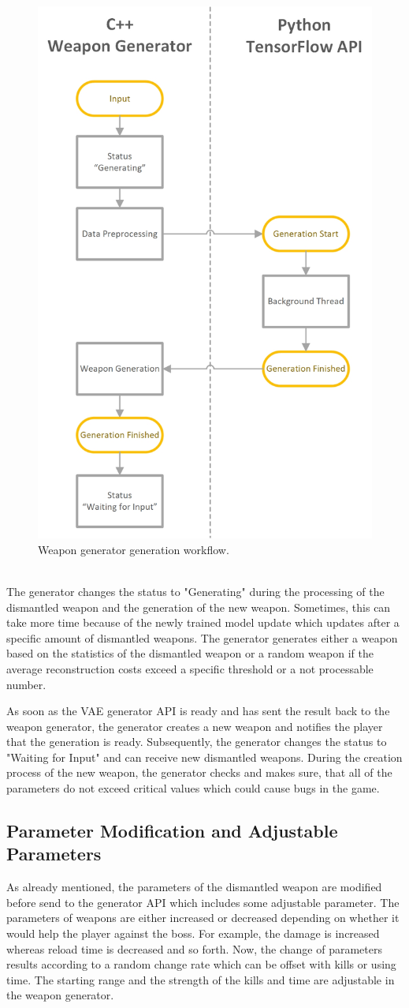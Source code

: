 \documentclass[MGS,Master,english]{twbook}%
\begin{document}
\begin{figure}[!ht]
	\centering
	\includegraphics[width=0.5\linewidth]{PICs/WeaponGeneratorWorkflow_Generation}
	\caption{Weapon generator generation workflow.} \label{figure::weaponGen::gen}
\end{figure}\\
The generator changes the status to "Generating" during the processing of the dismantled weapon and the generation of the new weapon. Sometimes, this can take more time because of the newly trained model update which updates after a specific amount of dismantled weapons. The generator generates either a weapon based on the statistics of the dismantled weapon or a random weapon if the average reconstruction costs exceed a specific threshold or a not processable number.

As soon as the VAE generator API is ready and has sent the result back to the weapon generator, the generator creates a new weapon and notifies the player that the generation is ready. Subsequently, the generator changes the status to "Waiting for Input" and can receive new dismantled weapons. During the creation process of the new weapon, the generator checks and makes sure, that all of the parameters do not exceed critical values which could cause bugs in the game. 

\subsection{Parameter Modification and Adjustable Parameters}
As already mentioned, the parameters of the dismantled weapon are modified before send to the generator API which includes some adjustable parameter. The parameters of weapons are either increased or decreased depending on whether it would help the player against the boss. For example, the damage is increased whereas reload time is decreased and so forth. Now, the change of parameters results according to a random change rate which can be offset with kills or using time. The starting range and the strength of the kills and time are adjustable in the weapon generator. 
\end{document}
